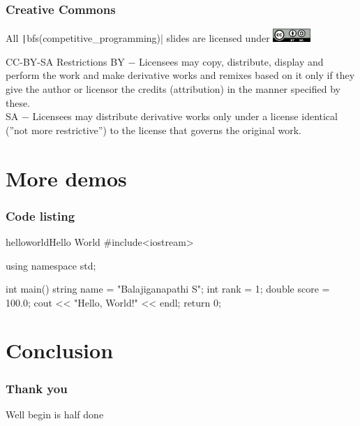 \begin{frame}
    \frametitle{Creative Commons}
    All \texttt|bfs(competitive_programming)| slides are licensed under \includegraphics[height=0.5cm]{CC-BY-SA_icon.png}
    \begin{alertblock}{CC-BY-SA Restrictions}
        \alert{BY} $-$ Licensees may copy, distribute, display and perform the work and make derivative works and remixes based on it only if they give the author or licensor the credits (attribution) in the manner specified by these. \\
        \alert{SA} $-$ Licensees may distribute derivative works only under a license identical (''not more restrictive'') to the license that governs the original work.  \\
    \end{alertblock}
\end{frame}

\section{More demos}
\begin{frame}[fragile]
    \frametitle{Code listing}

    \begin{cppcode}{helloworld}{Hello World}
        #include<iostream>
        
        using namespace std;

        int main() {
            string name = "Balajiganapathi S";
            int rank = 1;
            double score = 100.0;
            cout << "Hello, World!" << endl;
            return 0;
        }
    \end{cppcode}
\end{frame}

\section{Conclusion}
\begin{frame}
    \frametitle{Thank you}
    Well begin is half done
\end{frame}



